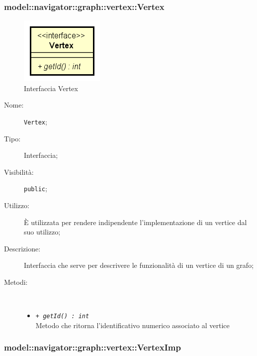 \documentclass[../DefinizioneDiProdotto.tex]{subfiles}
\begin{document}
\subsubsection{model::navigator::graph::vertex::Vertex}

    \begin{figure}[H]
        \centering
        \includegraphics{img/Vertex.png}
        \caption{Interfaccia Vertex}\label{fig:model::navigator::graph::vertex::Vertex} 
    \end{figure}
    \begin{description}
\item[Nome:] \texttt{Vertex};
\item[Tipo:] Interfaccia;
\item[Visibilità:] \texttt{public};
\item[Utilizzo:] È utilizzata per rendere indipendente l'implementazione di un vertice dal suo utilizzo;
\item[Descrizione:] Interfaccia che serve per descrivere le funzionalità di un vertice di un grafo;
\item[Metodi:] \
\begin{itemize}
\item \texttt{+ \textit{getId() : int}}\\
Metodo che ritorna l'identificativo numerico associato al vertice
 \end{itemize}
\end{description}

\subsubsection{model::navigator::graph::vertex::VertexImp}
\end{document}
